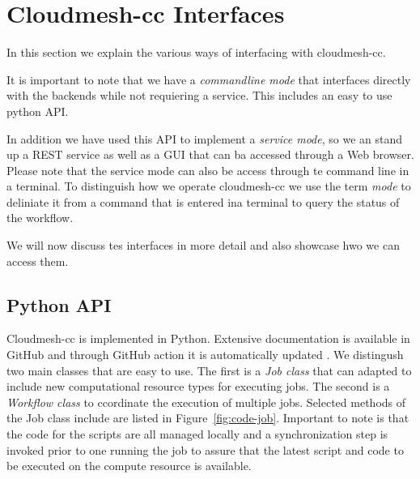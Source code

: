 
\section{Cloudmesh-cc Interfaces}

In this section we explain the various ways of interfacing with cloudmesh-cc.

It is important to note that we have a {\em commandline mode} that interfaces directly with the backends while not requiering a service. This includes an easy to use python API.

In addition we have used this API to implement a {\em service mode}, so we an stand up a REST service as well as a GUI that can ba accessed through a Web browser.
Please note that the service mode can also be access through te command line in a terminal. To distinguish how we operate cloudmesh-cc we use the term {\em mode} to deliniate it from a command that is entered ina terminal to query the status of the workflow.

We will now discuss tes interfaces in more detail and also showcase
hwo we can access them.


\subsection{Python API}

Cloudmesh-cc is implemented in Python. Extensive documentation is
available in GitHub and through GitHub action it is automatically
updated \cite{github-cloudmesh-cc}.  We distingush two main classes
that are easy to use. The first is a {\em Job class} that can adapted
to include new computational resource types for executing jobs. The
second is a {\em Workflow class} to ccordinate the execution of
multiple jobs. Selected methods of the Job class include are listed in
Figure~\ref{fig:code-job}. Important to note is that the code for the
scripts are all managed locally and a synchronization step is invoked
prior to one running the job to assure that the latest script and
code to be executed on the compute resource is available.

